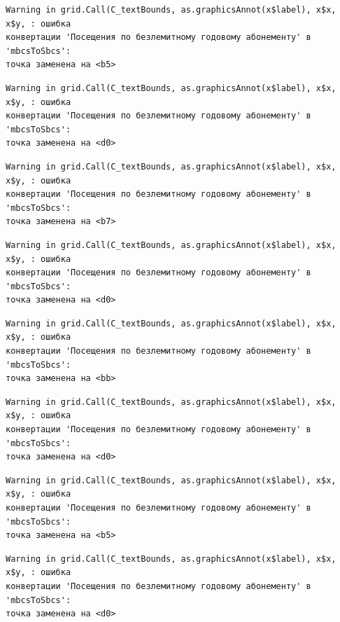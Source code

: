 \documentclass[
  letterpaper,
  DIV=11,
  numbers=noendperiod]{scrreprt}
\begin{document}
\begin{verbatim}
Warning in grid.Call(C_textBounds, as.graphicsAnnot(x$label), x$x, x$y, : ошибка
конвертации 'Посещения по безлемитному годовому абонементу' в 'mbcsToSbcs':
точка заменена на <b5>
\end{verbatim}

\begin{verbatim}
Warning in grid.Call(C_textBounds, as.graphicsAnnot(x$label), x$x, x$y, : ошибка
конвертации 'Посещения по безлемитному годовому абонементу' в 'mbcsToSbcs':
точка заменена на <d0>
\end{verbatim}

\begin{verbatim}
Warning in grid.Call(C_textBounds, as.graphicsAnnot(x$label), x$x, x$y, : ошибка
конвертации 'Посещения по безлемитному годовому абонементу' в 'mbcsToSbcs':
точка заменена на <b7>
\end{verbatim}

\begin{verbatim}
Warning in grid.Call(C_textBounds, as.graphicsAnnot(x$label), x$x, x$y, : ошибка
конвертации 'Посещения по безлемитному годовому абонементу' в 'mbcsToSbcs':
точка заменена на <d0>
\end{verbatim}

\begin{verbatim}
Warning in grid.Call(C_textBounds, as.graphicsAnnot(x$label), x$x, x$y, : ошибка
конвертации 'Посещения по безлемитному годовому абонементу' в 'mbcsToSbcs':
точка заменена на <bb>
\end{verbatim}

\begin{verbatim}
Warning in grid.Call(C_textBounds, as.graphicsAnnot(x$label), x$x, x$y, : ошибка
конвертации 'Посещения по безлемитному годовому абонементу' в 'mbcsToSbcs':
точка заменена на <d0>
\end{verbatim}

\begin{verbatim}
Warning in grid.Call(C_textBounds, as.graphicsAnnot(x$label), x$x, x$y, : ошибка
конвертации 'Посещения по безлемитному годовому абонементу' в 'mbcsToSbcs':
точка заменена на <b5>
\end{verbatim}

\begin{verbatim}
Warning in grid.Call(C_textBounds, as.graphicsAnnot(x$label), x$x, x$y, : ошибка
конвертации 'Посещения по безлемитному годовому абонементу' в 'mbcsToSbcs':
точка заменена на <d0>
\end{verbatim}
\end{document}
